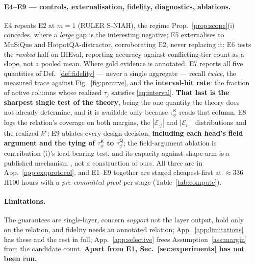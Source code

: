 \documentclass{article}
\newcommand{\tauK}{\tau^{\mathsf{K}}_\phi}
\newcommand{\tauQ}{\tau^{\mathsf{Q}}_\phi}
\begin{document}
\paragraph{E4--E9 --- controls, externalisation, fidelity, diagnostics, ablations.} E4 repeats E2
at $m=1$ (RULER S-NIAH), the regime Prop.~\ref{prop:scope}(i) concedes, where a \emph{large} gap
is the interesting negative; E5 externalises to MuSiQue and HotpotQA-distractor,
corroborating E2, never replacing it; E6 tests the \emph{ranked} half on IHEval, reporting
accuracy against conflicting-tier count as a slope, not a pooled mean. Where gold evidence is annotated, E7
reports all five quantities of Def.~\ref{def:fidelity} --- never a single aggregate --- recall
\emph{twice}, the measured trace against Fig.~\ref{fig:prcurve}, and the \textbf{interval-hit
rate}: the fraction of active columns whose realized $\tau_j$ satisfies \eqref{eq:interval}.
\textbf{That last is the sharpest single test of the theory}, being the one quantity the theory
does not already determine, and it is available only because $\tauK$ reads that column. E8 logs the
relation's coverage on both margins, the $|\mathcal{E}_{\cdot j}|$ and $|\mathcal{E}_{i\cdot}|$
distributions and the realized $k^\star$; E9 ablates every design decision,
\textbf{including each head's field argument and the tying of $\tauK$ to $\tauQ$}; the
field-argument ablation is contribution (i)'s load-bearing test, and its capacity-against-shape
arm is a published mechanism \citep{zhang2023mesh}, not a construction of ours. All three are in
App.~\ref{app:expprotocol}, and E1--E9 together are staged cheapest-first at $\approx336$
H100-hours with a \emph{pre-committed pivot} per stage (Table~\ref{tab:compute}).

\paragraph{Limitations.} The guarantees are single-layer, concern \emph{support} not the layer
output, hold only on the relation, and fidelity needs an annotated relation;
App.~\ref{app:limitations} has these and the rest in full;
App.~\ref{app:selective} frees Assumption~\ref{ass:margin} from the candidate count.
\textbf{Apart from E1, Sec.~\ref{sec:experiments} has not been run.}
\end{document}
